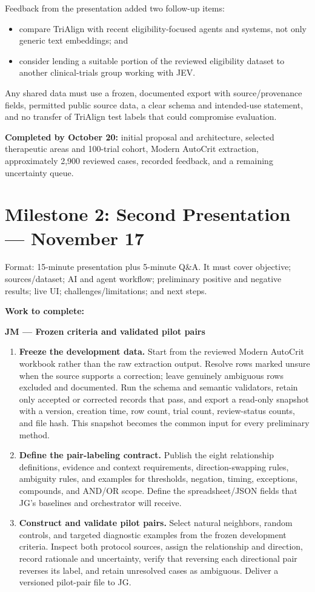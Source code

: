 \documentclass[10pt]{article}
\begin{document}
Feedback from the presentation added two follow-up items:
\begin{itemize}
\item compare TriAlign with recent eligibility-focused agents and systems, not only generic text embeddings; and
\item consider lending a suitable portion of the reviewed eligibility dataset to another clinical-trials group working with JEV.
\end{itemize}
Any shared data must use a frozen, documented export with source/provenance fields, permitted public source data, a clear schema and intended-use statement, and no transfer of TriAlign test labels that could compromise evaluation.

\textbf{Completed by October 20:} initial proposal and architecture, selected therapeutic areas and 100-trial cohort, Modern AutoCrit extraction, approximately 2,900 reviewed cases, recorded feedback, and a remaining uncertainty queue.

\section{Milestone 2: Second Presentation --- November 17}
Format: 15-minute presentation plus 5-minute Q\&A. It must cover objective; sources/dataset; AI and agent workflow; preliminary positive and negative results; live UI; challenges/limitations; and next steps.

\textbf{Work to complete:}

\textbf{JM --- Frozen criteria and validated pilot pairs}
\begin{enumerate}
\item \textbf{Freeze the development data.} Start from the reviewed Modern AutoCrit workbook rather than the raw extraction output. Resolve rows marked unsure when the source supports a correction; leave genuinely ambiguous rows excluded and documented. Run the schema and semantic validators, retain only accepted or corrected records that pass, and export a read-only snapshot with a version, creation time, row count, trial count, review-status counts, and file hash. This snapshot becomes the common input for every preliminary method.
\item \textbf{Define the pair-labeling contract.} Publish the eight relationship definitions, evidence and context requirements, direction-swapping rules, ambiguity rules, and examples for thresholds, negation, timing, exceptions, compounds, and AND/OR scope. Define the spreadsheet/JSON fields that JG's baselines and orchestrator will receive.
\item \textbf{Construct and validate pilot pairs.} Select natural neighbors, random controls, and targeted diagnostic examples from the frozen development criteria. Inspect both protocol sources, assign the relationship and direction, record rationale and uncertainty, verify that reversing each directional pair reverses its label, and retain unresolved cases as ambiguous. Deliver a versioned pilot-pair file to JG.
\end{enumerate}
\end{document}
